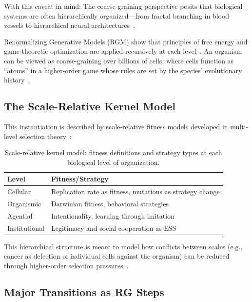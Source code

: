 \documentclass[12pt,a4paper]{article}
\theoremstyle{remark}
\begin{document}
With this caveat in mind: The coarse-graining perspective posits that biological systems are often hierarchically organized---from fractal branching in blood vessels to hierarchical neural architectures~\citep{SelfSimilarNetworks}.

Renormalizing Generative Models (RGM) show that principles of free energy and game-theoretic optimization are applied recursively at each level~\citep{ScaleRGFrontiers}. An organism can be viewed as coarse-graining over billions of cells, where cells function as ``atoms'' in a higher-order game whose rules are set by the species' evolutionary history~\citep{ReplicatorOptimization}.

\subsection{The Scale-Relative Kernel Model}

This instantiation is described by scale-relative fitness models developed in multi-level selection theory~\citep{Okasha2006,Michod1999,ReplicatorOptimization}:

\begin{table}[htbp]
\centering
\caption{Scale-relative kernel model: fitness definitions and strategy types at each biological level of organization.}
\label{tab:scale-kernel}
\begin{tabularx}{\textwidth}{@{}L{0.25\textwidth} Y@{}}
\toprule
\textbf{Level} & \textbf{Fitness/Strategy} \\
\midrule
Cellular & Replication rate as fitness, mutations as strategy change \\
Organismic & Darwinian fitness, behavioral strategies \\
Agential & Intentionality, learning through imitation \\
Institutional & Legitimacy and social cooperation as ESS \\
\bottomrule
\end{tabularx}
\end{table}

This hierarchical structure is meant to model how conflicts between scales (e.g., cancer as defection of individual cells against the organism) can be reduced through higher-order selection pressures~\citep{ReplicatorOptimization}.

\subsection{Major Transitions as RG Steps}
\end{document}
